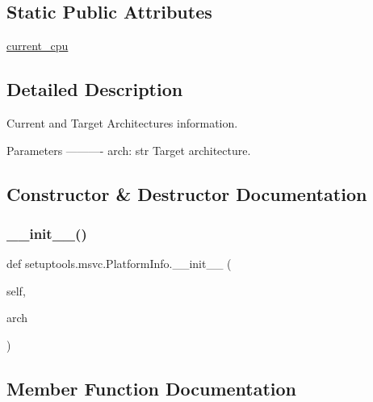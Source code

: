 \subsection*{Static Public Attributes}
\begin{DoxyCompactItemize}
\item 
\hyperlink{classsetuptools_1_1msvc_1_1PlatformInfo_afd49633c8aa48d6a0162a9ce5aaa72bc}{current\+\_\+cpu}
\end{DoxyCompactItemize}


\subsection{Detailed Description}
\begin{DoxyVerb}Current and Target Architectures information.

Parameters
----------
arch: str
    Target architecture.
\end{DoxyVerb}
 

\subsection{Constructor \& Destructor Documentation}
\mbox{\label{classsetuptools_1_1msvc_1_1PlatformInfo_aa98d6a4ffa306e85dba513ac18612492}} 
\subsubsection{\texorpdfstring{\+\_\+\+\_\+init\+\_\+\+\_\+()}{\_\_init\_\_()}}
{\footnotesize\ttfamily def setuptools.\+msvc.\+Platform\+Info.\+\_\+\+\_\+init\+\_\+\+\_\+ (\begin{DoxyParamCaption}\item[{}]{self,  }\item[{}]{arch }\end{DoxyParamCaption})}



\subsection{Member Function Documentation}
\mbox{\label{classsetuptools_1_1msvc_1_1PlatformInfo_a9cd7bd8ff66ddc3b79fe7448c52f1504}} 
